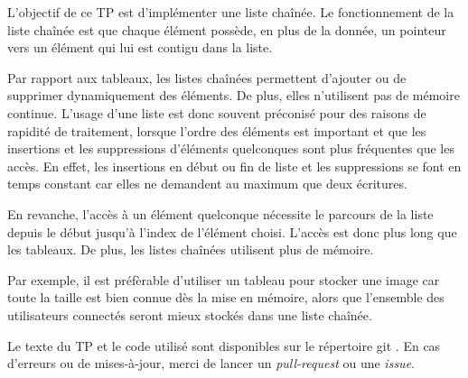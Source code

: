 \documentclass[conference]{IEEEtran}
\begin{document}
L'objectif de ce TP est d'implémenter une liste chaînée.
Le fonctionnement de la liste chaînée est que chaque élément possède, en plus de la donnée, un pointeur vers un élément qui lui est contigu dans la liste.

Par rapport aux tableaux, les listes chaînées permettent d'ajouter ou de supprimer dynamiquement des éléments. De plus, elles n'utilisent pas de mémoire continue.
L'usage d'une liste est donc souvent préconisé pour des raisons de rapidité de traitement, lorsque l'ordre des éléments est important et que les insertions et les suppressions d'éléments quelconques sont plus fréquentes que les accès.
En effet, les insertions en début ou fin de liste et les suppressions se font en temps constant car elles ne demandent au maximum que deux écritures.

En revanche, l'accès à un élément quelconque nécessite le parcours de la liste depuis le début jusqu'à l'index de l'élément choisi. L'accès est donc plus long que les tableaux. De plus, les listes chaînées utilisent plus de mémoire.

Par exemple, il est préfèrable d'utiliser un tableau pour stocker une image car toute la taille est bien connue dès la mise en mémoire, alors que l'ensemble des utilisateurs connectés seront mieux stockés dans une liste chaînée.



Le texte du TP et le code utilisé sont disponibles sur le répertoire git \cite{git}. En cas d'erreurs ou de mises-à-jour, merci de lancer un \emph{pull-request} ou une \emph{issue}.
\end{document}
